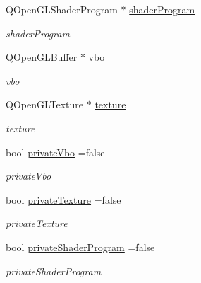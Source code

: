 \begin{DoxyCompactItemize}
\mbox{\label{classmyObjects_a3aebf3bf2954d78d703e927819a57559}} 
Q\+Open\+G\+L\+Shader\+Program $\ast$ \hyperlink{classmyObjects_a3aebf3bf2954d78d703e927819a57559}{shader\+Program}
\begin{DoxyCompactList}\small\item\em shader\+Program \end{DoxyCompactList}\item 
\mbox{\label{classmyObjects_adf868552b7a0a8acbbef2e8b5470e403}} 
Q\+Open\+G\+L\+Buffer $\ast$ \hyperlink{classmyObjects_adf868552b7a0a8acbbef2e8b5470e403}{vbo}
\begin{DoxyCompactList}\small\item\em vbo \end{DoxyCompactList}\item 
\mbox{\label{classmyObjects_a25fb21a6fe5ef009137a77605d531c33}} 
Q\+Open\+G\+L\+Texture $\ast$ \hyperlink{classmyObjects_a25fb21a6fe5ef009137a77605d531c33}{texture}
\begin{DoxyCompactList}\small\item\em texture \end{DoxyCompactList}\item 
\mbox{\label{classmyObjects_a5074349d0065b918a9ba2b80835faa1d}} 
bool \hyperlink{classmyObjects_a5074349d0065b918a9ba2b80835faa1d}{private\+Vbo} =false
\begin{DoxyCompactList}\small\item\em private\+Vbo \end{DoxyCompactList}\item 
\mbox{\label{classmyObjects_ac26e5fcb31d9f261056007943c53c4a1}} 
bool \hyperlink{classmyObjects_ac26e5fcb31d9f261056007943c53c4a1}{private\+Texture} =false
\begin{DoxyCompactList}\small\item\em private\+Texture \end{DoxyCompactList}\item 
\mbox{\label{classmyObjects_af02a152336729bea65cf9666d8eea96b}} 
bool \hyperlink{classmyObjects_af02a152336729bea65cf9666d8eea96b}{private\+Shader\+Program} =false
\begin{DoxyCompactList}\small\item\em private\+Shader\+Program \end{DoxyCompactList}\end{DoxyCompactItemize}



